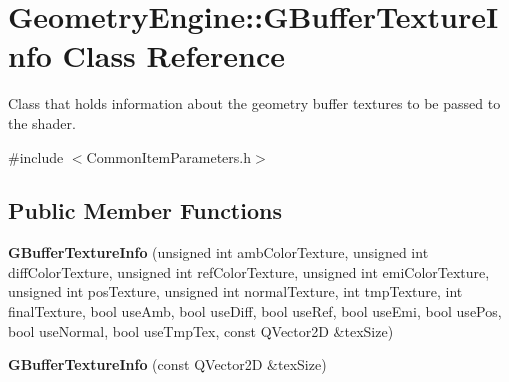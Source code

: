 \hypertarget{class_geometry_engine_1_1_g_buffer_texture_info}{}\section{Geometry\+Engine\+::G\+Buffer\+Texture\+Info Class Reference}
\label{class_geometry_engine_1_1_g_buffer_texture_info}


Class that holds information about the geometry buffer textures to be passed to the shader.  




{\ttfamily \#include $<$Common\+Item\+Parameters.\+h$>$}

\subsection*{Public Member Functions}
\begin{DoxyCompactItemize}
\item 
\mbox{\label{class_geometry_engine_1_1_g_buffer_texture_info_afbf90d9af515ea582a09e8378c65d5c3}} 
{\bfseries G\+Buffer\+Texture\+Info} (unsigned int amb\+Color\+Texture, unsigned int diff\+Color\+Texture, unsigned int ref\+Color\+Texture, unsigned int emi\+Color\+Texture, unsigned int pos\+Texture, unsigned int normal\+Texture, int tmp\+Texture, int final\+Texture, bool use\+Amb, bool use\+Diff, bool use\+Ref, bool use\+Emi, bool use\+Pos, bool use\+Normal, bool use\+Tmp\+Tex, const Q\+Vector2D \&tex\+Size)
\item 
\mbox{\label{class_geometry_engine_1_1_g_buffer_texture_info_a813289a200b77f99e997e4fd74da9a73}} 
{\bfseries G\+Buffer\+Texture\+Info} (const Q\+Vector2D \&tex\+Size)
\end{DoxyCompactItemize}
